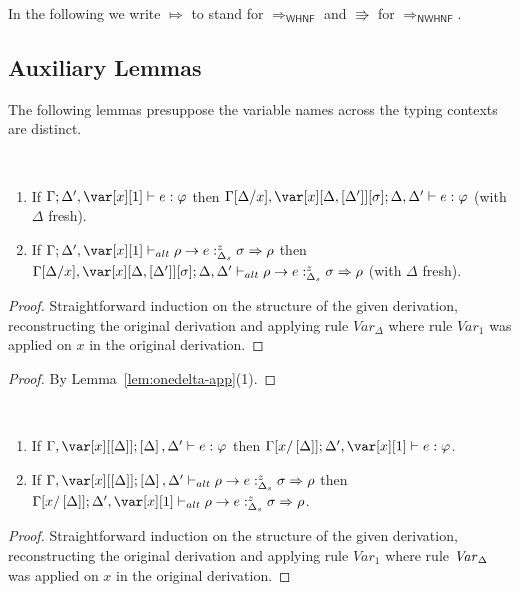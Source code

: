 \documentclass[acmsmall,review,screen]{acmart}
\begin{document}
In the following we write $\Mapsto$ to stand for
$\Rightarrow_\mathsf{WHNF}$ and $\Rrightarrow$ for $\Rightarrow_\mathsf{NWHNF}$.

\subsection{Auxiliary Lemmas}
The following lemmas presuppose the variable names across the typing
contexts are distinct.

  \begin{lemma}~\label{lem:onedelta-app}

    \begin{enumerate}
    
      \item If $\G; \D',\xl \vdash e :\vp$
        then $\G[\D/x],\xD; \D,\D' \vdash e : \vp$ (with $\Delta$ fresh).
      \item If $\G ; \D' , \xl \vdash_{alt} \rho \rightarrow e
        :^z_{\Delta_s} \sigma \Rightarrow \rho$ then
        $\G[\D/x],\xD;\D,\D' \vdash_{alt} \rho \rightarrow e
        :^z_{\Delta_s} \sigma \Rightarrow \rho$ (with $\Delta$ fresh).
   
      \end{enumerate}
\end{lemma}
\begin{proof}
Straightforward induction on the structure of the given derivation,
reconstructing the original derivation and applying rule
$\mathit{Var}_\Delta$ where rule $\mathit{Var}_1$ was applied on
$x$ in the original derivation.
\end{proof}
\onedelta*

\begin{proof}
By Lemma~\ref{lem:onedelta-app}(1).
\end{proof}



\begin{lemma}~\label{lem:deltaone-app}

  \begin{enumerate}
 \item If $\G,\x[\irr{\D}]; \irr{\D},\D' \vdash e : \vp$
   then $\G[x/\irr{\D}]; \D',\xl \vdash e :\vp$.
 \item If $\G ,\x[\irr{\D}]; \irr{\D}, \D' \vdash_{alt} \rho \rightarrow e
   :^z_{\Delta_s} \sigma \Rightarrow \rho$ then
   $\G[x/\irr{\D}];\D',\xl \vdash_{alt} \rho \rightarrow e
   :^z_{\Delta_s} \sigma \Rightarrow \rho$.
  \end{enumerate}
\end{lemma}
\begin{proof}
Straightforward induction on the structure of the given derivation,
reconstructing the original derivation and applying rule
$\mathit{Var}_1$ where rule $\mathit{Var}_\Delta$ was applied on
$x$ in the original derivation.
\end{proof}
\end{document}
